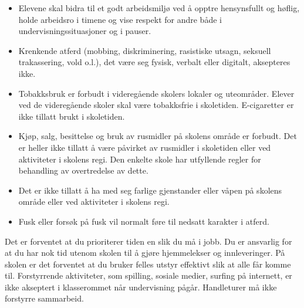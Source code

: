 \begin{itemize}
\item{}Elevene skal bidra til et godt arbeidsmiljø ved å opptre hensynsfullt og høflig, holde arbeidsro i timene og vise respekt for andre både i undervisningssituasjoner og i pauser.
\item{}Krenkende atferd (mobbing, diskriminering, rasistiske utsagn, seksuell trakassering, vold o.l.), det være seg fysisk, verbalt eller digitalt, aksepteres ikke.
\item{}Tobakksbruk er forbudt i videregående skolers lokaler og uteområder. Elever ved de videregående skoler skal være tobakksfrie i skoletiden. E-cigaretter er ikke tillatt brukt i skoletiden.
\item{}Kjøp, salg, besittelse og bruk av rusmidler på skolens område er forbudt. Det er heller ikke tillatt å være påvirket av rusmidler i skoletiden eller ved aktiviteter i skolens regi. Den enkelte skole har utfyllende regler for behandling av overtredelse av dette.
\item{}Det er ikke tillatt å ha med seg farlige gjenstander eller våpen på skolens område eller ved aktiviteter i skolens regi.
\item{}Fusk eller forsøk på fusk vil normalt føre til nedsatt karakter i atferd.
\end{itemize}
\vskip 10pt

%
%
%
%
%

\noindent
{} Det er forventet at du prioriterer tiden en slik du må i jobb. Du er ansvarlig for at du har nok tid utenom skolen til å gjøre hjemmelekser og innleveringer. På skolen er det forventet at du bruker felles utstyr effektivt slik at alle får komme til. Forstyrrende aktiviteter, som spilling, sosiale medier, surfing på internett, er ikke akseptert i klasserommet når undervisning pågår. Handleturer må ikke forstyrre sammarbeid. 


